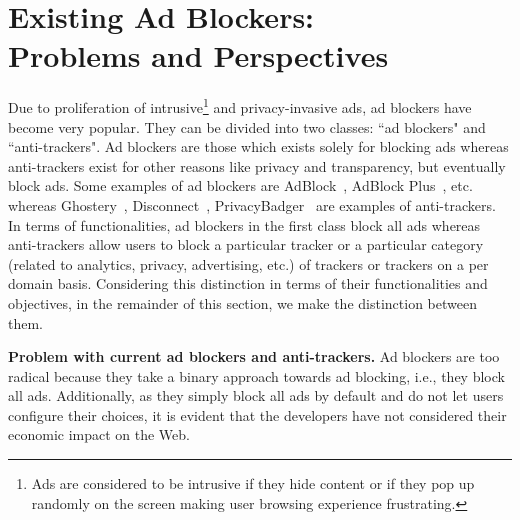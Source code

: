 \documentclass[conference]{IEEEtran}
\begin{document}
\section{Existing Ad Blockers:\\ Problems and Perspectives}
\label{sec:problem_adblockers}
Due to proliferation of intrusive\footnote{Ads are considered to be intrusive if 
they hide content or if they pop up randomly on the screen making user browsing experience frustrating.} 
and privacy-invasive ads, ad blockers have become very popular.
They can be divided into two classes: ``ad blockers" and ``anti-trackers".
Ad blockers are those which exists solely for blocking ads whereas anti-trackers exist for other reasons like privacy and transparency, but eventually block ads.
Some examples of ad blockers are AdBlock~\cite{Adblock16Web}, AdBlock Plus~\cite{AdblockPlus16Web}, etc. whereas Ghostery~\cite{Ghostery16Web}, Disconnect~\cite{Disconnect16Web}, PrivacyBadger~\cite{PrivacyBadger16Web} are examples of anti-trackers.
In terms of functionalities, ad blockers in the first class block all ads whereas anti-trackers allow users to block a particular tracker or a particular category (related to analytics, privacy, advertising, etc.) of trackers or trackers on a per domain basis.
Considering this distinction in terms of their functionalities and objectives, in the remainder of this section, we make the distinction between them.


\textbf{Problem with current ad blockers and anti-trackers.}
Ad blockers are too radical because they take a binary approach towards ad blocking, i.e., they block all ads.
Additionally, as they simply block all ads by default and do not let users configure their choices, it is evident that the developers have not considered their economic impact on the Web.
\end{document}
